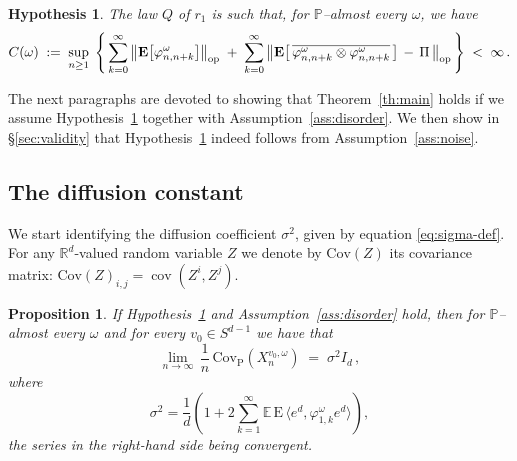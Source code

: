 \documentclass[a4paper,reqno,11pt]{amsart}
\numberwithin{equation}{section}
\newtheorem{proposition}[theorem]{Proposition}
\newtheorem{hypothesis}[theorem]{Hypothesis}
\newcommand{\bbE}{{\ensuremath{\mathbb E}} }
\newcommand{\bbP}{{\ensuremath{\mathbb P}} }
\newcommand{\gs}{\sigma}
\newcommand{\go}{\omega}
\newcommand{\R}{\mathbb{R}}
\DeclareMathOperator{\cov}{cov}
\def\bP{\ensuremath{\bs{\mathrm{P}}}}
\def\bE{\ensuremath{\bs{\mathrm{E}}}}
\def\bs{\boldsymbol}
\renewcommand{\phi}{\varphi}
\begin{document}
\medskip

\begin{hypothesis}
\label{hyp:main}
The law $Q$ of $r_1$ is such that, for $\bbP$--almost every $\omega$, we have
\begin{equation}
 C(\go) \;:=\;
 \sup_{n \ge 1} \; \left\{ \, \sum_{k=0}^\infty \big\|
 \bE \big[ \phi^{\go}_{n,n+k} \big] \big\|_{\rm{op}} \;+\;
 \sum_{k=0}^\infty \big\|
 \bE \big[\, \overline{\phi^{\go}_{n,n+k} \otimes \phi^{\go}_{n,n+k}} \, \big]
 \,-\, \Pi \, \big\|_{\rm{op}} \,\right\} \;<\; \infty\,.
 \end{equation}
\end{hypothesis}

\smallskip
\noindent
The next paragraphs are devoted to showing that
Theorem~\ref{th:main} holds if we assume Hypothesis~\ref{hyp:main}
together with Assumption~\ref{ass:disorder}. We then show
in \S\ref{sec:validity} that Hypothesis~\ref{hyp:main} indeed
follows from Assumption~\ref{ass:noise}.


\smallskip

\subsection{The diffusion constant}

We start identifying the diffusion coefficient $\gs^2$,
given by equation \eqref{eq:sigma-def}.
For any $\R^d$-valued random variable $Z$ we denote by $\mathrm{Cov}(Z)$ 
its covariance matrix: $\mathrm{Cov}(Z)_{i,j}= \cov(Z^i,Z ^j)$.


\begin{proposition}
\label{th:lem1}
If Hypothesis~\ref{hyp:main} and Assumption~\ref{ass:disorder} hold,
then for $\bbP$--almost every $\go$ and for every $v_0 \in S^{d-1}$ we have that
\begin{equation}
\label{eq:lem1}
\lim_{n \to \infty} \, \frac 1n \,
\mathrm{Cov}_{\bP} \left( 
X_n^{v_0, \go}
\right)
\; =\; \sigma^2 I_d \,,
\end{equation}
where
\begin{equation} \label{eq:sigma2-def}
\sigma^2 = 
\frac 1d \left( 1+2 \sum_{k=1}^\infty
\bbE \, \bE \, \langle e^d, \varphi^\omega_{1,k} e^d \rangle
\right),
\end{equation}
the series in the right-hand side being convergent.
\end{proposition}

\medskip
\end{document}
